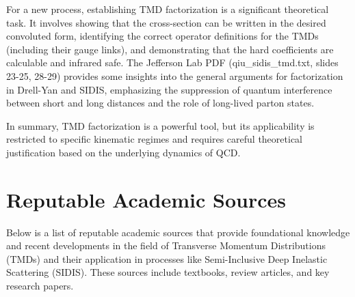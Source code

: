 \documentclass[11pt]{article}
\begin{document}
For a new process, establishing TMD factorization is a significant theoretical task. It involves showing that the cross-section can be written in the
desired convoluted form, identifying the correct operator definitions for the TMDs (including their gauge links), and demonstrating that the hard
coefficients are calculable and infrared safe. The Jefferson Lab PDF (qiu\_sidis\_tmd.txt, slides 23-25, 28-29) provides some insights into the
general arguments for factorization in Drell-Yan and SIDIS, emphasizing the suppression of quantum interference between short and long distances and
the role of long-lived parton states.

In summary, TMD factorization is a powerful tool, but its applicability is restricted to specific kinematic regimes and requires careful theoretical
justification based on the underlying dynamics of QCD.

\section{Reputable Academic Sources}

Below is a list of reputable academic sources that provide foundational knowledge and recent developments in the field of Transverse Momentum
Distributions (TMDs) and their application in processes like Semi-Inclusive Deep Inelastic Scattering (SIDIS). These sources include textbooks,
review articles, and key research papers.
\end{document}

